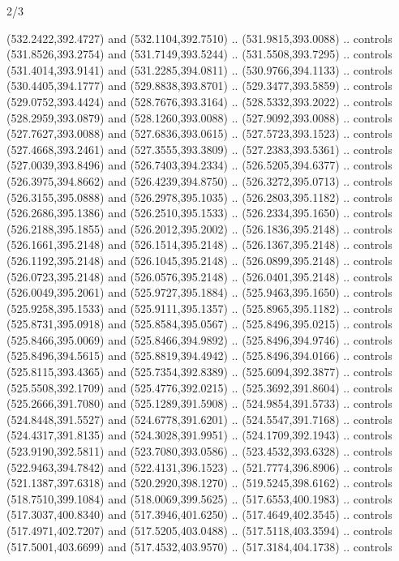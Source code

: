 \begin{flagdescription}{2/3}
\begin{scope}[xshift=0.5\flaglength,yshift=0.5\flagwidth,scale=\flagwidth/495.65]
\begin{scope}[y=0.8pt, x=0.8pt, yscale=-1,shift={(-463.76,-309.78)}]
  (532.2422,392.4727) and (532.1104,392.7510) .. (531.9815,393.0088) .. controls
  (531.8526,393.2754) and (531.7149,393.5244) .. (531.5508,393.7295) .. controls
  (531.4014,393.9141) and (531.2285,394.0811) .. (530.9766,394.1133) .. controls
  (530.4405,394.1777) and (529.8838,393.8701) .. (529.3477,393.5859) .. controls
  (529.0752,393.4424) and (528.7676,393.3164) .. (528.5332,393.2022) .. controls
  (528.2959,393.0879) and (528.1260,393.0088) .. (527.9092,393.0088) .. controls
  (527.7627,393.0088) and (527.6836,393.0615) .. (527.5723,393.1523) .. controls
  (527.4668,393.2461) and (527.3555,393.3809) .. (527.2383,393.5361) .. controls
  (527.0039,393.8496) and (526.7403,394.2334) .. (526.5205,394.6377) .. controls
  (526.3975,394.8662) and (526.4239,394.8750) .. (526.3272,395.0713) .. controls
  (526.3155,395.0888) and (526.2978,395.1035) .. (526.2803,395.1182) .. controls
  (526.2686,395.1386) and (526.2510,395.1533) .. (526.2334,395.1650) .. controls
  (526.2188,395.1855) and (526.2012,395.2002) .. (526.1836,395.2148) .. controls
  (526.1661,395.2148) and (526.1514,395.2148) .. (526.1367,395.2148) .. controls
  (526.1192,395.2148) and (526.1045,395.2148) .. (526.0899,395.2148) .. controls
  (526.0723,395.2148) and (526.0576,395.2148) .. (526.0401,395.2148) .. controls
  (526.0049,395.2061) and (525.9727,395.1884) .. (525.9463,395.1650) .. controls
  (525.9258,395.1533) and (525.9111,395.1357) .. (525.8965,395.1182) .. controls
  (525.8731,395.0918) and (525.8584,395.0567) .. (525.8496,395.0215) .. controls
  (525.8466,395.0069) and (525.8466,394.9892) .. (525.8496,394.9746) .. controls
  (525.8496,394.5615) and (525.8819,394.4942) .. (525.8496,394.0166) .. controls
  (525.8115,393.4365) and (525.7354,392.8389) .. (525.6094,392.3877) .. controls
  (525.5508,392.1709) and (525.4776,392.0215) .. (525.3692,391.8604) .. controls
  (525.2666,391.7080) and (525.1289,391.5908) .. (524.9854,391.5733) .. controls
  (524.8448,391.5527) and (524.6778,391.6201) .. (524.5547,391.7168) .. controls
  (524.4317,391.8135) and (524.3028,391.9951) .. (524.1709,392.1943) .. controls
  (523.9190,392.5811) and (523.7080,393.0586) .. (523.4532,393.6328) .. controls
  (522.9463,394.7842) and (522.4131,396.1523) .. (521.7774,396.8906) .. controls
  (521.1387,397.6318) and (520.2920,398.1270) .. (519.5245,398.6162) .. controls
  (518.7510,399.1084) and (518.0069,399.5625) .. (517.6553,400.1983) .. controls
  (517.3037,400.8340) and (517.3946,401.6250) .. (517.4649,402.3545) .. controls
  (517.4971,402.7207) and (517.5205,403.0488) .. (517.5118,403.3594) .. controls
  (517.5001,403.6699) and (517.4532,403.9570) .. (517.3184,404.1738) .. controls

\end{scope}
\end{scope}
\end{flagdescription}
